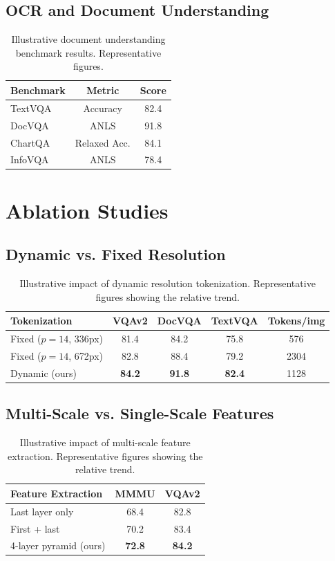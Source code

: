 \documentclass[11pt,a4paper]{article}
\begin{document}
\subsection{OCR and Document Understanding}

\begin{table}[H]
\centering
\caption{Illustrative document understanding benchmark results. Representative figures.}
\label{tab:ocr}
\begin{tabular}{lcc}
\toprule
Benchmark & Metric & Score \\
\midrule
TextVQA & Accuracy & 82.4 \\
DocVQA & ANLS & 91.8 \\
ChartQA & Relaxed Acc. & 84.1 \\
InfoVQA & ANLS & 78.4 \\
\bottomrule
\end{tabular}
\end{table}

\section{Ablation Studies}

\subsection{Dynamic vs. Fixed Resolution}

\begin{table}[H]
\centering
\caption{Illustrative impact of dynamic resolution tokenization. Representative figures showing the relative trend.}
\label{tab:ablation_res}
\begin{tabular}{lcccc}
\toprule
Tokenization & VQAv2 & DocVQA & TextVQA & Tokens/img \\
\midrule
Fixed ($p=14$, 336px) & 81.4 & 84.2 & 75.8 & 576 \\
Fixed ($p=14$, 672px) & 82.8 & 88.4 & 79.2 & 2304 \\
Dynamic (ours) & \textbf{84.2} & \textbf{91.8} & \textbf{82.4} & 1128 \\
\bottomrule
\end{tabular}
\end{table}

\subsection{Multi-Scale vs. Single-Scale Features}

\begin{table}[H]
\centering
\caption{Illustrative impact of multi-scale feature extraction. Representative figures showing the relative trend.}
\label{tab:ablation_scale}
\begin{tabular}{lcc}
\toprule
Feature Extraction & MMMU & VQAv2 \\
\midrule
Last layer only & 68.4 & 82.8 \\
First + last & 70.2 & 83.4 \\
4-layer pyramid (ours) & \textbf{72.8} & \textbf{84.2} \\
\bottomrule
\end{tabular}
\end{table}
\end{document}
